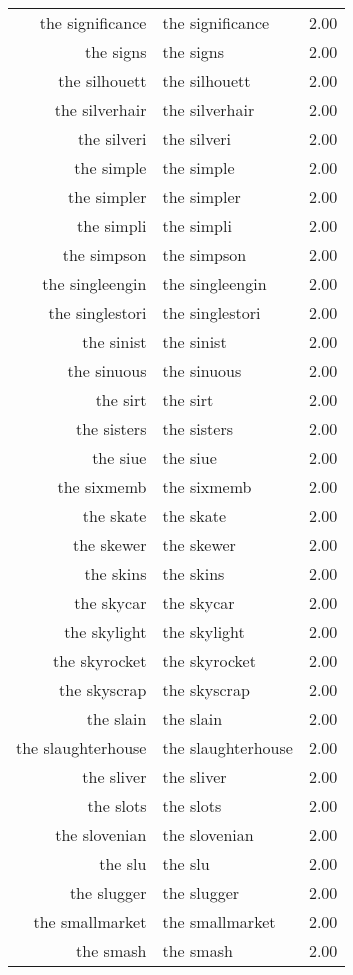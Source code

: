 \begin{table}[ht]
\begin{tabular}{rlr}
  the significance & the significance & 2.00 \\ 
  the signs & the signs & 2.00 \\ 
  the silhouett & the silhouett & 2.00 \\ 
  the silverhair & the silverhair & 2.00 \\ 
  the silveri & the silveri & 2.00 \\ 
  the simple & the simple & 2.00 \\ 
  the simpler & the simpler & 2.00 \\ 
  the simpli & the simpli & 2.00 \\ 
  the simpson & the simpson & 2.00 \\ 
  the singleengin & the singleengin & 2.00 \\ 
  the singlestori & the singlestori & 2.00 \\ 
  the sinist & the sinist & 2.00 \\ 
  the sinuous & the sinuous & 2.00 \\ 
  the sirt & the sirt & 2.00 \\ 
  the sisters & the sisters & 2.00 \\ 
  the siue & the siue & 2.00 \\ 
  the sixmemb & the sixmemb & 2.00 \\ 
  the skate & the skate & 2.00 \\ 
  the skewer & the skewer & 2.00 \\ 
  the skins & the skins & 2.00 \\ 
  the skycar & the skycar & 2.00 \\ 
  the skylight & the skylight & 2.00 \\ 
  the skyrocket & the skyrocket & 2.00 \\ 
  the skyscrap & the skyscrap & 2.00 \\ 
  the slain & the slain & 2.00 \\ 
  the slaughterhouse & the slaughterhouse & 2.00 \\ 
  the sliver & the sliver & 2.00 \\ 
  the slots & the slots & 2.00 \\ 
  the slovenian & the slovenian & 2.00 \\ 
  the slu & the slu & 2.00 \\ 
  the slugger & the slugger & 2.00 \\ 
  the smallmarket & the smallmarket & 2.00 \\ 
  the smash & the smash & 2.00 \\ 

\end{tabular}
\end{table}
